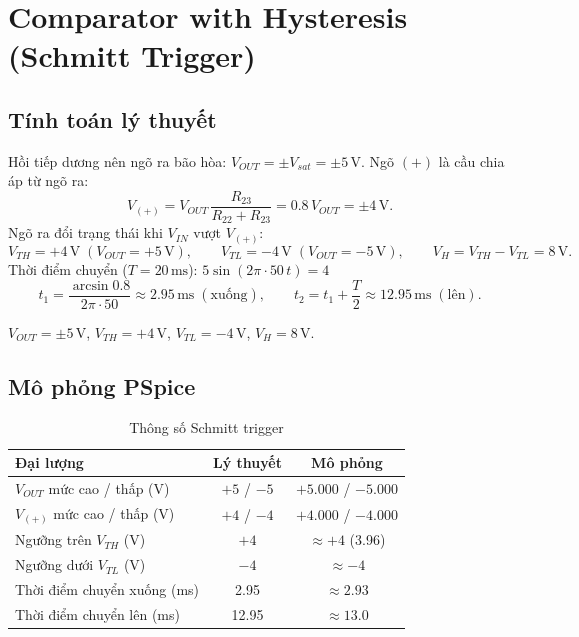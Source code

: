 \section{Comparator with Hysteresis (Schmitt Trigger)}\label{sec:schmitt}

\subsection{Tính toán lý thuyết}
Hồi tiếp dương nên ngõ ra bão hòa: $V_{OUT} = \pm V_{sat} = \pm 5\,\text{V}$. Ngõ $(+)$ là cầu chia áp từ ngõ ra:
\[
V_{(+)} = V_{OUT}\,\frac{R_{23}}{R_{22} + R_{23}} = 0.8\,V_{OUT} = \pm 4\,\text{V}.
\]
Ngõ ra đổi trạng thái khi $V_{IN}$ vượt $V_{(+)}$:
\[
V_{TH} = +4\,\text{V}\;(V_{OUT} = +5\,\text{V}),\qquad
V_{TL} = -4\,\text{V}\;(V_{OUT} = -5\,\text{V}),\qquad
V_H = V_{TH} - V_{TL} = 8\,\text{V}.
\]
Thời điểm chuyển ($T = 20\,\text{ms}$): $5\sin(2\pi\cdot 50\,t) = 4$
\[
t_1 = \frac{\arcsin 0.8}{2\pi \cdot 50} \approx 2.95\,\text{ms}\;(\text{xuống}),\qquad
t_2 = t_1 + \frac{T}{2} \approx 12.95\,\text{ms}\;(\text{lên}).
\]

\begin{dapsobox}
$V_{OUT} = \pm 5\,\text{V}$, \quad $V_{TH} = +4\,\text{V}$, \quad $V_{TL} = -4\,\text{V}$, \quad $V_H = 8\,\text{V}$.
\end{dapsobox}

\subsection{Mô phỏng PSpice}
\simresult
{}

\begin{table}[H]
\centering
\begin{tabular}{l c c}
\toprule
\textbf{Đại lượng} & \textbf{Lý thuyết} & \textbf{Mô phỏng}\\
\midrule
$V_{OUT}$ mức cao / thấp (V) & $+5$ / $-5$ & $+5.000$ / $-5.000$\\
$V_{(+)}$ mức cao / thấp (V) & $+4$ / $-4$ & $+4.000$ / $-4.000$\\
Ngưỡng trên $V_{TH}$ (V)     & $+4$        & $\approx +4$ (3.96)\\
Ngưỡng dưới $V_{TL}$ (V)     & $-4$        & $\approx -4$\\
Thời điểm chuyển xuống (ms)  & 2.95        & $\approx 2.93$\\
Thời điểm chuyển lên (ms)    & 12.95       & $\approx 13.0$\\
\bottomrule
\end{tabular}
\caption{Thông số Schmitt trigger}
\end{table}

